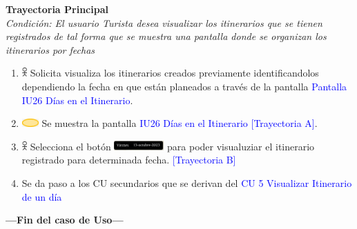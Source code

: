 \textbf{Trayectoria Principal}\\
\textit{Condición: El usuario Turista desea visualizar los itinerarios que se tienen registrados de tal forma que se muestra una pantalla donde se organizan los itinerarios por fechas}
\begin{enumerate}
    \item \includegraphics[width=0.0150\textwidth]{Figuras/persona.png} Solicita visualiza los itinerarios creados previamente identificandolos dependiendo la fecha en que están planeados a través de la pantalla {\textcolor{blue}{Pantalla IU26 Días en el Itinerario}}.
    \item \includegraphics[width=0.0500\textwidth]{Figuras/sistema.png} Se muestra la pantalla {\textcolor{blue}{IU26 Días en el Itinerario}} {\textcolor{blue}{[Trayectoria A]}}.
    \item \includegraphics[width=0.0150\textwidth]{Figuras/persona.png} Selecciona el botón  \includegraphics[width=0.150\textwidth]{ComponentesCU/Itinerario.PNG} para poder visualuziar el itinerario registrado para determinada fecha. {\textcolor{blue}{[Trayectoria B]}}
    \item Se da paso a los CU secundarios que se derivan del {\textcolor{blue}{CU 5 Visualizar Itinerario de un día}}
\end{enumerate}
\textbf{---Fin del caso de Uso---}
\vspace{15pt}

